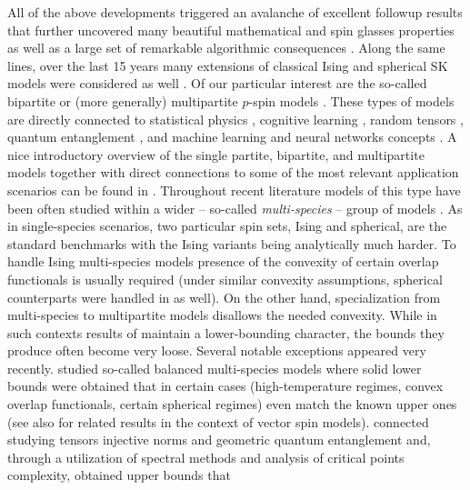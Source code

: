 \documentclass[10pt]{article}
\begin{document}
All of the above developments triggered an avalanche of excellent followup results that further uncovered many beautiful mathematical and spin glasses properties \cite{Talbook11a,Talbook11b,AuffChen15,Auffetal20,JagTob16,MourratPan20,HuangSell23a,Gametal23} as well as a large set of remarkable algorithmic consequences \cite{Gamar21,GamJag21,AlaouiMS22,AlaouiMS25,HuangS22,HuangSell23,HuangSell24,Subag24,Subag21,Montanari19}. Along the same lines, over the last 15 years many extensions of classical Ising and spherical SK models were considered as well \cite{ChenMourrat25,Mourrat23,PanMult15,PanPotts18,ChenIM25,Chenetal21,Chenetal23,Subag23,ChenPan18,Barraetal15,Ko20,DeyWu21}.
 Of our particular interest are the so-called bipartite  or (more generally) multipartite $p$-spin models \cite{BaikLee20,Barra2011,McKenna24,Kivimae23,Little74,Hop82,Pan18,MourratInf24,StojnicMoreSophHopBnds10,StojnicAsymmLittBnds11,AuffChen14,Amari72,AGS87,AmiGutSom85,Barraetal18,ContGal08,Fedele12,Albetal21}. These types of models are directly connected to statistical physics \cite{KorFyodShen87,KorFyodShen87a,KorShen85}, cognitive learning \cite{Little74,Hop82,KroHop16,Amari72,Hebb49,PasFig78}, random tensors \cite{Bandetal25,DarMc24,Rosetal19,BAetal19,ChenHL21,Lesetal17,JagLM20},  quantum entanglement  \cite{Shim95,BL01,WG03},  and machine learning and neural networks concepts \cite{DeanRit01,AGS87,AmiGutSom85,Barraetal18,Rametal21,Stojnichebhop24,Newman88,MPRV87,FST00,Louk94,Louk97,PasShchTir94,ShchTir93,BarGenGueTan10,BarGenGueTan12,BovGay98,Tal98}. A nice introductory overview of the single partite, bipartite, and multipartite models together with direct connections to some of the most relevant application scenarios can be found in \cite{MourratInf24}. Throughout  recent literature models of this type have been often studied within a wider -- so-called \emph{multi-species} -- group of models  \cite{FedCon11,ChenIM25,Pan18,Barraetal15,Batesetal19,BatesSohn22a,BatesSohn22,Subagtap23a,Subagtap23b,BatesSohn25}. As in single-species scenarios, two particular spin sets, Ising and spherical, are the standard benchmarks with the Ising variants being  analytically much harder. To handle Ising multi-species models presence of the convexity of certain overlap functionals is usually required \cite{Pan18,Barraetal15} (under similar convexity assumptions,  spherical counterparts were handled in \cite{Batesetal19,BatesSohn22a,BatesSohn22} as well). On the other hand, specialization from multi-species to multipartite models disallows the needed convexity. While in such contexts results of \cite{Pan18} maintain a lower-bounding character, the bounds they produce often become very loose. Several notable exceptions appeared very recently. \cite{BatesSohn25}  studied so-called balanced multi-species models where solid lower bounds were obtained that in certain cases (high-temperature regimes, convex overlap functionals, certain spherical regimes) even match the known upper ones (see also \cite{Issa24} for related results in the context of vector spin models). \cite{DarMc24} connected studying tensors injective norms \cite{Groth52,Lim21}  and geometric quantum entanglement \cite{Shim95,BL01,WG03}   and, through a utilization of spectral methods and analysis of critical points complexity, obtained upper bounds that 
\end{document}
